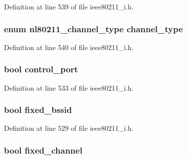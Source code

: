 Definition at line 539 of file ieee80211\-\_\-i.\-h.

\hypertarget{structieee80211__if__ibss_a54d35cd8a215e66908b8671a70fa4fca}{
\subsubsection[{channel\-\_\-type}]{\setlength{\rightskip}{0pt plus 5cm}enum nl80211\-\_\-channel\-\_\-type channel\-\_\-type}}\label{structieee80211__if__ibss_a54d35cd8a215e66908b8671a70fa4fca}


Definition at line 540 of file ieee80211\-\_\-i.\-h.

\hypertarget{structieee80211__if__ibss_a5f56e2447bde008fc2d675dcd029fc17}{
\subsubsection[{control\-\_\-port}]{\setlength{\rightskip}{0pt plus 5cm}bool control\-\_\-port}}\label{structieee80211__if__ibss_a5f56e2447bde008fc2d675dcd029fc17}


Definition at line 533 of file ieee80211\-\_\-i.\-h.

\hypertarget{structieee80211__if__ibss_a7930c3868b223ce60e12e84d087b3f58}{
\subsubsection[{fixed\-\_\-bssid}]{\setlength{\rightskip}{0pt plus 5cm}bool fixed\-\_\-bssid}}\label{structieee80211__if__ibss_a7930c3868b223ce60e12e84d087b3f58}


Definition at line 529 of file ieee80211\-\_\-i.\-h.

\hypertarget{structieee80211__if__ibss_aaeb95af3104d555b91418ca7b173e7ac}{
\subsubsection[{fixed\-\_\-channel}]{\setlength{\rightskip}{0pt plus 5cm}bool fixed\-\_\-channel}}\label{structieee80211__if__ibss_aaeb95af3104d555b91418ca7b173e7ac}


